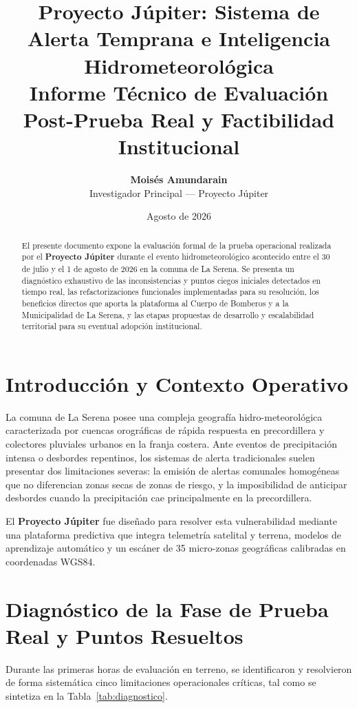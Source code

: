 \documentclass[11pt,a4paper]{article}
\title{\textbf{Proyecto Júpiter: Sistema de Alerta Temprana e Inteligencia Hidrometeorológica}\\
\large Informe Técnico de Evaluación Post-Prueba Real y Factibilidad Institucional}
\author{\textbf{Moisés Amundarain}\\
Investigador Principal --- Proyecto Júpiter}
\date{Agosto de 2026}
\begin{document}
\spanishdeactivate{><}

\maketitle

\begin{abstract}
El presente documento expone la evaluación formal de la prueba operacional realizada por el \textbf{Proyecto Júpiter} durante el evento hidrometeorológico acontecido entre el 30 de julio y el 1 de agosto de 2026 en la comuna de La Serena. Se presenta un diagnóstico exhaustivo de las inconsistencias y puntos ciegos iniciales detectados en tiempo real, las refactorizaciones funcionales implementadas para su resolución, los beneficios directos que aporta la plataforma al Cuerpo de Bomberos y a la Municipalidad de La Serena, y las etapas propuestas de desarrollo y escalabilidad territorial para su eventual adopción institucional.
\end{abstract}

\newpage

\section{Introducción y Contexto Operativo}

La comuna de La Serena posee una compleja geografía hidro-meteorológica caracterizada por cuencas orográficas de rápida respuesta en precordillera y colectores pluviales urbanos en la franja costera. Ante eventos de precipitación intensa o desbordes repentinos, los sistemas de alerta tradicionales suelen presentar dos limitaciones severas: la emisión de alertas comunales homogéneas que no diferencian zonas secas de zonas de riesgo, y la imposibilidad de anticipar desbordes cuando la precipitación cae principalmente en la precordillera.

El \textbf{Proyecto Júpiter} fue diseñado para resolver esta vulnerabilidad mediante una plataforma predictiva que integra telemetría satelital y terrena, modelos de aprendizaje automático y un escáner de 35 micro-zonas geográficas calibradas en coordenadas WGS84.


\section{Diagnóstico de la Fase de Prueba Real y Puntos Resueltos}

Durante las primeras horas de evaluación en terreno, se identificaron y resolvieron de forma sistemática cinco limitaciones operacionales críticas, tal como se sintetiza en la Tabla~\ref{tab:diagnostico}.
\end{document}

